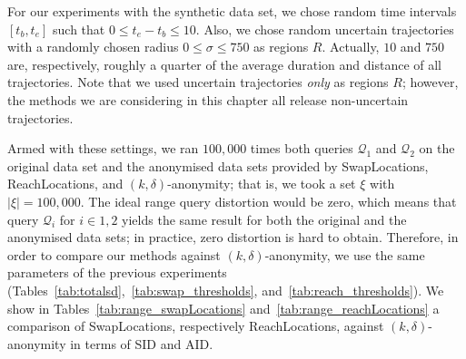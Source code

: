 For our experiments with the synthetic data set, we chose random
time intervals $[t_b, t_e]$ such that $0 \leq t_e - t_b \leq 10$.
Also, we chose random uncertain trajectories with a randomly
chosen radius $0 \leq \sigma \leq 750$ as regions $R$.
Actually, $10$ and $750$ are, respectively, roughly a quarter of
the average duration and distance of all trajectories. Note that
we used uncertain trajectories {\em only} as regions $R$; however,
the methods we are considering in this chapter all
release non-uncertain trajectories.

Armed with these settings, we ran $100,000$ times
both queries $\mathcal{Q}_1$ and $\mathcal{Q}_2$ on the original data set
and the anonymised data sets provided by SwapLocations, ReachLocations,
and $(k, \delta)$-anonymity; that is, we took a set $\xi$ with
$|\xi|=100,000$.
The ideal range query distortion would be zero,
which means that query $\mathcal{Q}_{i}$ for $i \in {1,2}$ yields the same
result for both the original and the anonymised data sets; in practice,
zero distortion is hard to obtain. Therefore, in order to compare
our methods against $(k, \delta)$-anonymity, we use the same parameters
of the previous experiments (Tables~\ref{tab:totalsd},~\ref{tab:swap_thresholds}, and~\ref{tab:reach_thresholds}).
We show in Tables~\ref{tab:range_swapLocations}
and~\ref{tab:range_reachLocations} a comparison of SwapLocations,
respectively ReachLocations, against $(k,\delta)$-anonymity in terms
of SID and AID.

